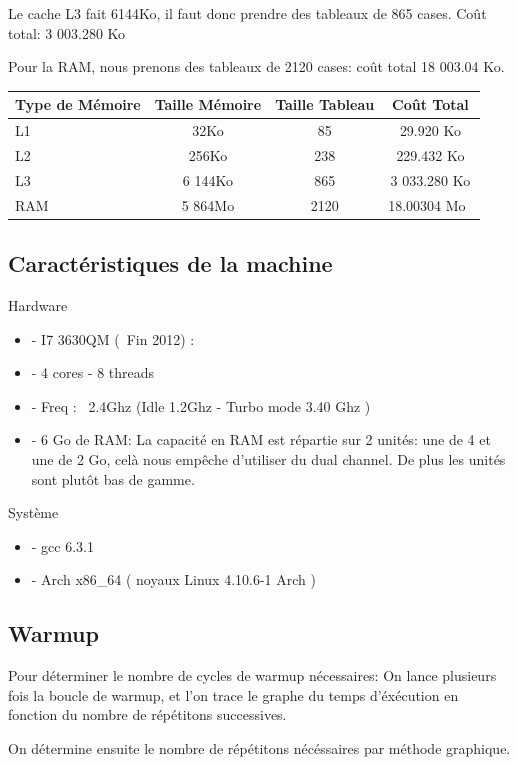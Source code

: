 \documentclass{report}
\begin{document}
Le cache L3 fait 6144Ko, il faut donc prendre des tableaux de 865 cases. Coût total: 3 003.280 Ko

Pour la RAM, nous prenons des tableaux de 2120 cases: coût total 18 003.04 Ko.

\begin{tabular}{ l c | c c }
    Type de Mémoire & Taille Mémoire & Taille Tableau & Coût Total\\\hline
    L1 & 32Ko & 85 & 29.920 Ko\\ 
    L2 & 256Ko & 238 & 229.432 Ko \\
    L3 & 6 144Ko & 865 & 3 033.280 Ko \\
    RAM & 5 864Mo & 2120 & 18.00304 Mo \\
\end{tabular}

\subsection*{Caractéristiques de la machine}

Hardware
\begin{itemize}
    \item{- I7 3630QM (~Fin 2012) :}
    \item{- 4 cores - 8 threads}
    \item{- Freq : ~2.4Ghz (Idle 1.2Ghz - Turbo mode 3.40 Ghz )}
    \item{- 6 Go de RAM:  La capacité en RAM est répartie sur 2 unités: une de 4 et une de 2 Go, celà nous empêche d'utiliser du dual channel. De plus les unités sont plutôt bas de gamme.}
\end{itemize}

Système
\begin{itemize}
    \item{- gcc 6.3.1}
    \item{- Arch x86\_64 ( noyaux Linux 4.10.6-1 Arch )}
\end{itemize}

\subsection*{Warmup}

Pour déterminer le nombre de cycles de warmup nécessaires: On lance plusieurs fois la boucle de warmup, et l'on trace le graphe du temps d'éxécution en fonction du nombre de répétitons successives.

On détermine ensuite le nombre de répétitons nécéssaires par méthode graphique.
\end{document}
